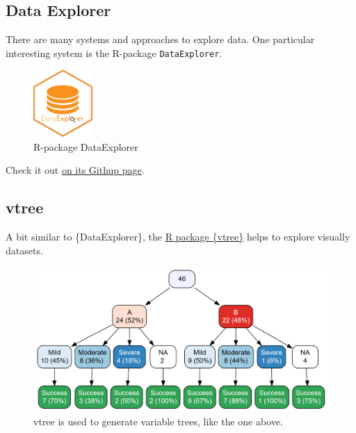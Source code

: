 \documentclass[
  letterpaper,
  DIV=11,
  numbers=noendperiod]{scrreprt}
\theoremstyle{definition}
\theoremstyle{definition}
\theoremstyle{remark}
\begin{document}
\hypertarget{data-explorer}{%
\subsection{Data Explorer}\label{data-explorer}}

There are many systems and approaches to explore data. One particular
interesting system is the R-package \texttt{DataExplorer}.

\begin{figure}

{\centering \includegraphics[width=0.2\textwidth,height=\textheight]{./img/dataexplorer-logo.png}

}

\caption{R-package DataExplorer}

\end{figure}

Check it out \href{http://boxuancui.github.io/DataExplorer/}{on its
Githup page}.

\hypertarget{vtree}{%
\subsection{vtree}\label{vtree}}

A bit similar to \{DataExplorer\}, the
\href{https://nbarrowman.github.io/vtree}{R package \{vtree\}} helps to
explore visually datasets.

\begin{figure}

{\centering \includegraphics{./img/vtree-vertical.png}

}

\caption{vtree is used to generate variable trees, like the one above.}

\end{figure}
\end{document}
